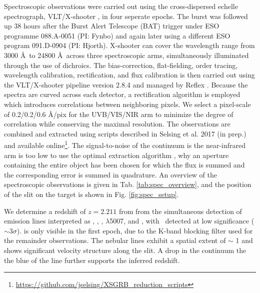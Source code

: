 \documentclass{aa}    %
\begin{document}
Spectroscopic observations were carried out using the cross-dispersed echelle spectrograph, VLT/X-shooter \citep{Vernet2011}, in four seperate epochs. The burst was followed up 38 hours after the Burst Alert Telescope (BAT) trigger under ESO programme 088.A-0051 (PI: Fynbo) and again later using a different ESO program 091.D-0904 (PI: Hjorth). X-shooter can cover the wavelength range from 3000 \AA~to 24800 \AA~across three spectroscopic arms, simultaneously illuminated through the use of dichroics. The bias-correction, flat-fielding, order tracing, wavelength calibration, rectification, and flux calibration is then carried out using the VLT/X-shooter pipeline version 2.8.4 \citep{Goldoni2006, Modigliani2010} and managed by Reflex \citep{Freudling2013}. Because the spectra are curved across each detector, a rectification algorithm is employed which introduces correlations between neighboring pixels. We select a pixel-scale of 0.2/0.2/0.6 \AA/pix for the UVB/VIS/NIR arm to minimize the degree of correlation while conserving the maximal resolution. The observations are combined and extracted using scripts described in Selsing et al. 2017 (in prep.) and available online\footnote{\url{https://github.com/jselsing/XSGRB_reduction_scripts}}. The signal-to-noise of the continuum is the near-infrared arm is too low to use the optimal extraction algorithm \citep{Horne1986}, why an aperture containing the entire object has been chosen for which the flux is summed and the corresponding error is summed in quadrature.
An overview of the spectroscopic observations is given in Tab. \ref{tab:spec_overview}, and the position of the slit on the target is shown in Fig. \ref{fig:spec_setup}.


We determine a redshift of $z = 2.211$ from from the simultaneous detection of emission lines interpreted as \lya, \oii, \hb, \oiii$\lambda$5007, and \ha, with \hb~detected at low significance ($\sim 3 \sigma$). \ha is only visible in the first epoch, due to the K-band blocking filter used for the remainder observations. The nebular lines exhibit a spatial extent of $\sim$ 1 and shows significant velocity structure along the slit. A drop in the continuum the the blue of the \lya line further supports the inferred redshift.
\end{document}
